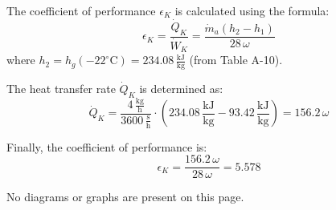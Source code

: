 The coefficient of performance \( \epsilon_K \) is calculated using the formula:  
\[
\epsilon_K = \frac{\dot{Q}_K}{\dot{W}_K} = \frac{\dot{m}_a (h_2 - h_1)}{28 \, \omega}
\]  
where \( h_2 = h_g(-22^\circ\text{C}) = 234.08 \, \frac{\text{kJ}}{\text{kg}} \) (from Table A-10).  

The heat transfer rate \( \dot{Q}_K \) is determined as:  
\[
\dot{Q}_K = \frac{4 \, \frac{\text{kg}}{\text{h}}}{3600 \, \frac{\text{s}}{\text{h}}} \cdot \left( 234.08 \, \frac{\text{kJ}}{\text{kg}} - 93.42 \, \frac{\text{kJ}}{\text{kg}} \right) = 156.2 \, \omega
\]  

Finally, the coefficient of performance is:  
\[
\epsilon_K = \frac{156.2 \, \omega}{28 \, \omega} = 5.578
\]  

No diagrams or graphs are present on this page.